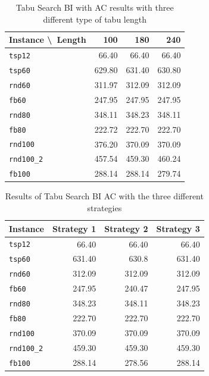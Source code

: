 		\vspace{1cm}
		
		\begin{table}[h]
			\centering
			\begin{tabular}{l r r r}
				\toprule
				\textbf{Instance \textbackslash~Length} & \textbf{100}    & \textbf{180}    & \textbf{240}    \\
				\midrule
				\verb|tsp12|                              & 66.40   & 66.40   & 66.40   \\
				\verb|tsp60|                              & 629.80  & 631.40  & 630.80  \\
				\verb|rnd60|                              & 311.97 & 312.09 & 312.09 \\
				\verb|fb60|                               & 247.95 & 247.95 & 247.95 \\
				\verb|rnd80|                              & 348.11 & 348.23 & 348.11 \\
				\verb|fb80|                               & 222.72 & 222.70  & 222.70  \\
				\verb|rnd100|                             & 376.20  & 370.09 & 370.09 \\
				\verb|rnd100_2|                           & 457.54 & 459.30  & 460.24 \\
				\verb|fb100|                              & 288.14 & 288.14 & 279.74 \\
				\bottomrule
			\end{tabular}
			\caption{Tabu Search BI with AC results with three different type of tabu length}
			\label{tab:ts-result}
		\end{table}
	
	\begin{table}[]
		\centering
		\begin{tabular}{lrrr}
			\toprule
		\textbf{Instance} & \textbf{Strategy 1} & \textbf{Strategy 2} & \textbf{Strategy 3} \\
			\toprule
		\verb|tsp12|     & 66.40               & 66.40     & 66.40     \\
		\verb|tsp60|     & 631.40              & 630.8     & 631.40      \\
		\verb|rnd60|     & 312.09              & 312.09     & 312.09    \\
		\verb|fb60|      & 247.95              & 240.47     & 247.95    \\
		\verb|rnd80|     & 348.23              & 348.11     & 348.23    \\
		\verb|fb80|      & 222.70              & 222.70     & 222.70    \\
		\verb|rnd100|    & 370.09              & 370.09     & 370.09   \\
		\verb|rnd100_2|  & 459.30              & 459.30    & 459.30     \\
		\verb|fb100|     & 288.14              & 278.56     & 288.14    \\
			\bottomrule      
		\end{tabular}
		\caption{Results of Tabu Search BI AC with the three different strategies}
		\label{tab:ts-results}
	\end{table}

